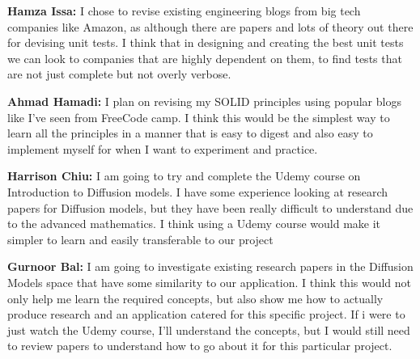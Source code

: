 \documentclass[12pt, titlepage]{article}
\begin{document}
\textbf{Hamza Issa:} I chose to revise existing engineering blogs from big tech companies like Amazon, as although there are papers and lots of theory out there for devising unit tests. I think that in designing and creating the best unit tests we can look to companies that are highly dependent on them, to find tests that are not just complete but not overly verbose.

\textbf{Ahmad Hamadi:} I plan on revising my SOLID principles using popular blogs like I’ve seen from FreeCode camp. I think this would be the simplest way to learn all the principles in a manner that is easy to digest and also easy to implement myself for when I want to experiment and practice.

\textbf{Harrison Chiu:} I am going to try and complete the Udemy course on Introduction to Diffusion models. I have some experience looking at research papers for Diffusion models, but they have been really difficult to understand due to the advanced mathematics. I think using a Udemy course would make it simpler to learn and easily transferable to our project

\textbf{Gurnoor Bal:} I am going to investigate existing research papers in the Diffusion Models space that have some similarity to our application. I think this would not only help me learn the required concepts, but also show me how to actually produce research and an application catered for this specific project. If i were to just watch the Udemy course, I’ll understand the concepts, but I would still need to review papers to understand how to go about it for this particular project.
\end{document}

